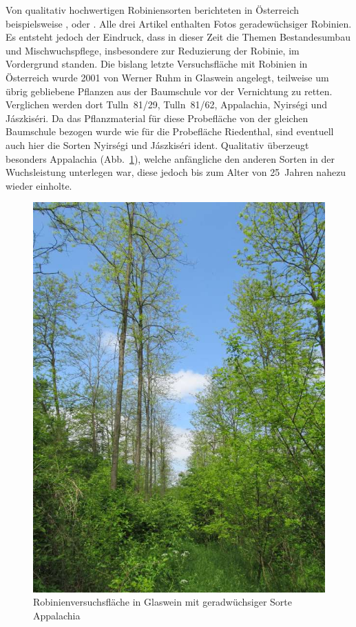 \documentclass[twocolumn]{scrartcl}
\begin{document}
Von qualitativ hochwertigen Robiniensorten berichteten in Österreich
beispielsweise \citet{mueller1991robinie}, \citet{iby1998robinie} oder
\citet{demel2004robinie}. Alle drei Artikel enthalten Fotos
geradewüchsiger Robinien. Es entsteht jedoch der Eindruck, dass in dieser
Zeit die Themen Bestandesumbau und Mischwuchspflege, insbesondere
zur Reduzierung der Robinie, im Vordergrund standen.
Die bislang letzte Versuchsfläche mit Robinien in Österreich wurde 2001
von Werner Ruhm in Glaswein angelegt, teilweise um übrig gebliebene
Pflanzen aus der Baumschule vor der Vernichtung zu retten.
Verglichen werden dort Tulln~81/29,
Tulln~81/62, Appalachia, Nyirségi und Jászkiséri. Da das
Pflanzmaterial für diese Probefläche von der gleichen Baumschule
bezogen wurde wie für die Probefläche Riedenthal, sind eventuell auch
hier die Sorten Nyirségi und Jászkiséri ident. Qualitativ überzeugt
besonders Appalachia (Abb.~\ref{fig:glaswein2}), welche anfängliche
den anderen Sorten in der Wuchsleistung unterlegen war, diese jedoch
bis zum Alter von 25~Jahren nahezu wieder einholte.

\begin{figure}[htbp]
  \centering
  \includegraphics[width=.9\linewidth]{./bild/GlasweinRobinie2023b}
  \caption{Robinienversuchsfläche in Glaswein mit geradwüchsiger Sorte Appalachia}
  \label{fig:glaswein2}
\end{figure}
\end{document}
